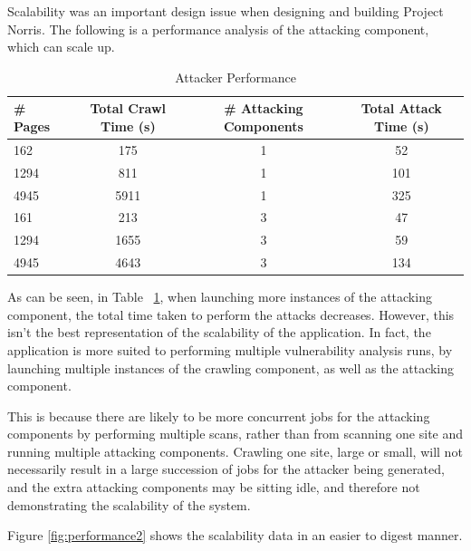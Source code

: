 \documentclass[12pt,a4paper]{article}
\begin{document}
Scalability was an important design issue when designing and building Project Norris.  The following is a performance analysis of the attacking component, which can scale up.

\begin{center}
    \begin{table}
        \caption{Attacker Performance}
        \begin{center}
            \begin{tabular}{ | l | c | c | c | }
                \hline
                \# Pages & Total Crawl Time (s) & \# Attacking Components & Total Attack Time (s)  \\ \hline
                162 & 175 & 1 & 52 \\ \hline
                1294 & 811 & 1 & 101 \\ \hline
                4945 & 5911 & 1 & 325 \\ \hline
                161 & 213 & 3 & 47 \\ \hline
                1294 & 1655 & 3 & 59 \\ \hline
                4945 & 4643 & 3 & 134 \\
                \hline
            \end{tabular}
        \end{center}
        \label{table:scalability}
    \end{table}
\end{center}

As can be seen, in Table ~\ref{table:scalability}, when launching more instances of the attacking component, the total time taken to perform the attacks decreases.  However, this isn't the best representation of the scalability of the application.  In fact, the application is more suited to performing multiple vulnerability analysis runs, by launching multiple instances of the crawling component, as well as the attacking component.  

This is because there are likely to be more concurrent jobs for the attacking components by performing multiple scans, rather than from scanning one site and running multiple attacking components.  Crawling one site, large or small, will not necessarily result in a large succession of jobs for the attacker being generated, and the extra attacking components may be sitting idle, and therefore not demonstrating the scalability of the system.

Figure \ref{fig:performance2} shows the scalability data in an easier to digest manner.
\end{document}
